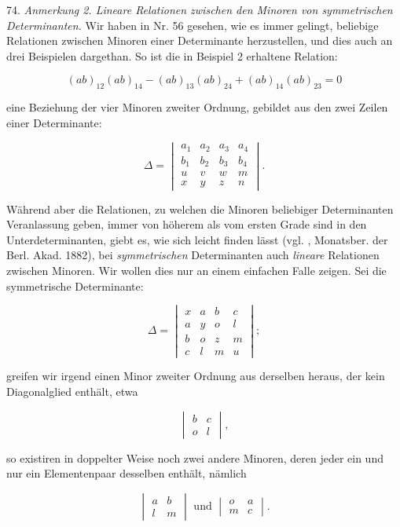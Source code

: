 \documentclass[11pt]{article}
\providecommand{\gesperrt}[1]{\textls[130]{#1}}
\providecommand{\weberpage}[1]{}
\begin{document}
74. \textit{Anmerkung 2. Lineare Relationen zwischen den Minoren von symmetrischen Determinanten.} Wir haben in Nr. 56 gesehen, wie es immer gelingt, beliebige Relationen zwischen Minoren einer Determinante herzustellen, und dies auch an drei Beispielen dargethan. So ist die in Beispiel 2 erhaltene Relation:

\[
(ab)_{12}(ab)_{14} - (ab)_{13}(ab)_{24} + (ab)_{14}(ab)_{23} = 0
\]

eine Beziehung der vier Minoren zweiter Ordnung, gebildet aus den zwei Zeilen einer Determinante:

\[
\varDelta =
\begin{vmatrix}
a_1 & a_2 & a_3 & a_4\\
b_1 & b_2 & b_3 & b_4\\
u & v & w & m\\
x & y & z & n
\end{vmatrix}.
\]

Während aber die Relationen, zu welchen die Minoren beliebiger Determinanten Veranlassung geben, immer von höherem als vom ersten Grade sind in den Unterdeterminanten, giebt es, wie sich leicht finden lässt (vgl. \gesperrt{Kronecker}, Monatsber. der Berl. Akad. 1882), bei \textit{symmetrischen} Determinanten auch \textit{lineare} Relationen zwischen Minoren. Wir wollen dies nur an einem einfachen Falle zeigen. Sei die symmetrische Determinante:

\[
\varDelta =
\begin{vmatrix}
x & a & b & c\\
a & y & o & l\\
b & o & z & m\\
c & l & m & u
\end{vmatrix};
\]


\weberpage{79}

greifen wir irgend einen Minor zweiter Ordnung aus derselben heraus, der kein Diagonalglied enthält, etwa

\[
\begin{vmatrix} b & c\\ o & l\end{vmatrix},
\]

so existiren in doppelter Weise noch zwei andere Minoren, deren jeder ein und nur ein Elementenpaar desselben enthält, nämlich

\[
\begin{vmatrix} a & b\\ l & m\end{vmatrix} \text{ und } \begin{vmatrix} o & a\\ m & c\end{vmatrix}.
\]
\end{document}
